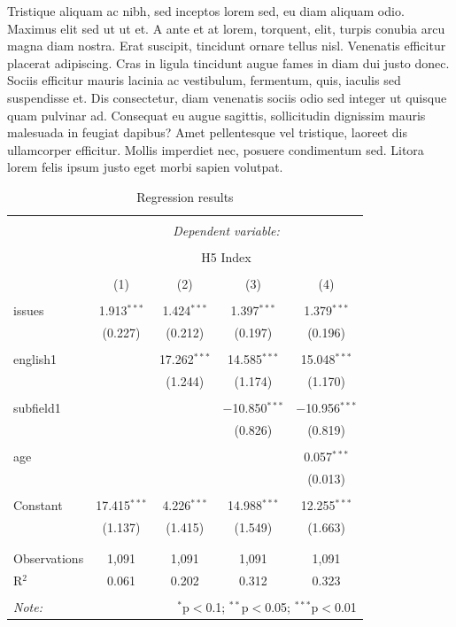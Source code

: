 \documentclass[
]{article}
\begin{document}
Tristique aliquam ac nibh, sed inceptos lorem sed, eu diam aliquam odio.
Maximus elit sed ut ut et. A ante et at lorem, torquent, elit, turpis
conubia arcu magna diam nostra. Erat suscipit, tincidunt ornare tellus
nisl. Venenatis efficitur placerat adipiscing. Cras in ligula tincidunt
augue fames in diam dui justo donec. Sociis efficitur mauris lacinia ac
vestibulum, fermentum, quis, iaculis sed suspendisse et. Dis
consectetur, diam venenatis sociis odio sed integer ut quisque quam
pulvinar ad. Consequat eu augue sagittis, sollicitudin dignissim mauris
malesuada in feugiat dapibus? Amet pellentesque vel tristique, laoreet
dis ullamcorper efficitur. Mollis imperdiet nec, posuere condimentum
sed. Litora lorem felis ipsum justo eget morbi sapien volutpat.

\begin{table}[!htbp] \centering 
  \caption{Regression results} 
  \label{regression} 
\begin{tabular}{@{\extracolsep{5pt}}lcccc} 
\\[-1.8ex]\hline 
\hline \\[-1.8ex] 
 & \multicolumn{4}{c}{\textit{Dependent variable:}} \\ 
\cline{2-5} 
\\[-1.8ex] & \multicolumn{4}{c}{H5 Index} \\ 
\\[-1.8ex] & (1) & (2) & (3) & (4)\\ 
\hline \\[-1.8ex] 
 issues & 1.913$^{***}$ & 1.424$^{***}$ & 1.397$^{***}$ & 1.379$^{***}$ \\ 
  & (0.227) & (0.212) & (0.197) & (0.196) \\ 
  & & & & \\ 
 english1 &  & 17.262$^{***}$ & 14.585$^{***}$ & 15.048$^{***}$ \\ 
  &  & (1.244) & (1.174) & (1.170) \\ 
  & & & & \\ 
 subfield1 &  &  & $-$10.850$^{***}$ & $-$10.956$^{***}$ \\ 
  &  &  & (0.826) & (0.819) \\ 
  & & & & \\ 
 age &  &  &  & 0.057$^{***}$ \\ 
  &  &  &  & (0.013) \\ 
  & & & & \\ 
 Constant & 17.415$^{***}$ & 4.226$^{***}$ & 14.988$^{***}$ & 12.255$^{***}$ \\ 
  & (1.137) & (1.415) & (1.549) & (1.663) \\ 
  & & & & \\ 
\hline \\[-1.8ex] 
Observations & 1,091 & 1,091 & 1,091 & 1,091 \\ 
R$^{2}$ & 0.061 & 0.202 & 0.312 & 0.323 \\ 
\hline 
\hline \\[-1.8ex] 
\textit{Note:}  & \multicolumn{4}{r}{$^{*}$p$<$0.1; $^{**}$p$<$0.05; $^{***}$p$<$0.01} \\ 
\end{tabular} 
\end{table}
\end{document}
